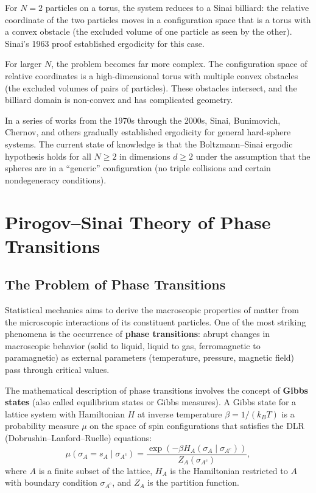 For \(N = 2\) particles on a torus, the system reduces to a Sinai billiard: the relative coordinate of the two particles moves in a configuration space that is a torus with a convex obstacle (the excluded volume of one particle as seen by the other). Sinai's 1963 proof established ergodicity for this case.

For larger \(N\), the problem becomes far more complex. The configuration space of relative coordinates is a high-dimensional torus with multiple convex obstacles (the excluded volumes of pairs of particles). These obstacles intersect, and the billiard domain is non-convex and has complicated geometry.

In a series of works from the 1970s through the 2000s, Sinai, Bunimovich, Chernov, and others gradually established ergodicity for general hard-sphere systems. The current state of knowledge is that the Boltzmann--Sinai ergodic hypothesis holds for all \(N \ge 2\) in dimensions \(d \ge 2\) under the assumption that the spheres are in a ``generic'' configuration (no triple collisions and certain nondegeneracy conditions).

\section{Pirogov--Sinai Theory of Phase Transitions}

\subsection{The Problem of Phase Transitions}

Statistical mechanics aims to derive the macroscopic properties of matter from the microscopic interactions of its constituent particles. One of the most striking phenomena is the occurrence of \textbf{phase transitions}: abrupt changes in macroscopic behavior (solid to liquid, liquid to gas, ferromagnetic to paramagnetic) as external parameters (temperature, pressure, magnetic field) pass through critical values.

The mathematical description of phase transitions involves the concept of \textbf{Gibbs states} (also called equilibrium states or Gibbs measures). A Gibbs state for a lattice system with Hamiltonian \(H\) at inverse temperature \(\beta = 1/(k_B T)\) is a probability measure \(\mu\) on the space of spin configurations that satisfies the DLR (Dobrushin--Lanford--Ruelle) equations:
\[
\mu(\sigma_A = s_A \mid \sigma_{A^c}) = \frac{\exp(-\beta H_A(\sigma_A \mid \sigma_{A^c}))}{Z_A(\sigma_{A^c})},
\]
where \(A\) is a finite subset of the lattice, \(H_A\) is the Hamiltonian restricted to \(A\) with boundary condition \(\sigma_{A^c}\), and \(Z_A\) is the partition function.

